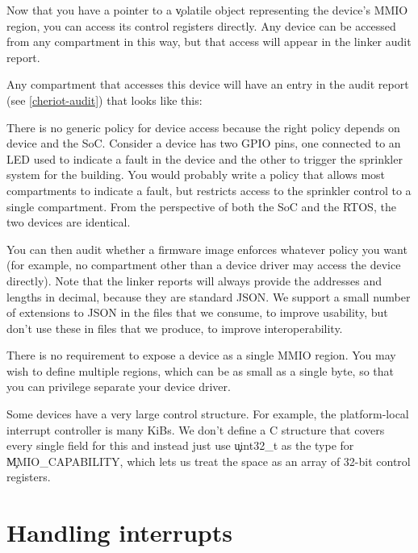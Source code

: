 Now that you have a pointer to a \c{volatile} object representing the device's MMIO region, you can access its control registers directly.
Any device can be accessed from any compartment in this way, but that access will appear in the linker audit report.


Any compartment that accesses this device will have an entry in the audit report (see \ref{cheriot-audit}) that looks like this:

\begin{jsonsnippet}
        {
          "kind": "MMIO",
          "length": 516,
          "start": 2550136832
        \},
\end{jsonsnippet}

\begin{note}
There is no generic policy for device access because the right policy depends on device and the SoC.
Consider a device has two GPIO pins, one connected to an LED used to indicate a fault in the device and the other to trigger the sprinkler system for the building.
You would probably write a policy that allows most compartments to indicate a fault, but restricts access to the sprinkler control to a single compartment.
From the perspective of both the SoC and the RTOS, the two devices are identical.
\end{note}

You can then audit whether a firmware image enforces whatever policy you want (for example, no compartment other than a device driver may access the device directly).
Note that the linker reports will always provide the addresses and lengths in decimal, because they are standard JSON.
We support a small number of extensions to JSON in the files that we consume, to improve usability, but don't use these in files that we produce, to improve interoperability.

There is no requirement to expose a device as a single MMIO region.
You may wish to define multiple regions, which can be as small as a single byte, so that you can privilege separate your device driver.

Some devices have a very large control structure.
For example, the platform-local interrupt controller is many KiBs.
We don't define a C structure that covers every single field for this and instead just use \c{uint32_t} as the type for \c{MMIO_CAPABILITY}, which lets us treat the space as an array of 32-bit control registers.

\section{Handling interrupts}

